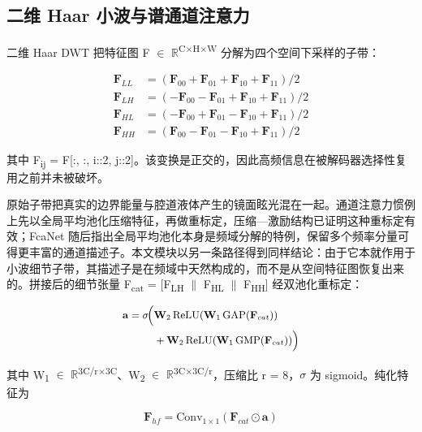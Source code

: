 \documentclass[conference]{IEEEtran}
\begin{document}
\subsection{二维 Haar 小波与谱通道注意力}

二维 Haar DWT 把特征图 F $\in$ $\mathbb{R}$\textsuperscript{C$\times$H$\times$W} 分解为四个空间下采样的子带：

\begin{align}
\mathbf{F}_{LL} &= (\mathbf{F}_{00}+\mathbf{F}_{01}+\mathbf{F}_{10}+\mathbf{F}_{11})/2\\\mathbf{F}_{LH} &= (-\mathbf{F}_{00}-\mathbf{F}_{01}+\mathbf{F}_{10}+\mathbf{F}_{11})/2\\\mathbf{F}_{HL} &= (-\mathbf{F}_{00}+\mathbf{F}_{01}-\mathbf{F}_{10}+\mathbf{F}_{11})/2\\\mathbf{F}_{HH} &= (\mathbf{F}_{00}-\mathbf{F}_{01}-\mathbf{F}_{10}+\mathbf{F}_{11})/2
\end{align}

其中 F\textsubscript{ij} = F[:, :, i::2, j::2]。该变换是正交的，因此高频信息在被解码器选择性复用之前并未被破坏。

原始子带把真实的边界能量与腔道液体产生的镜面眩光混在一起。通道注意力惯例上先以全局平均池化压缩特征，再做重标定，压缩—激励结构已证明这种重标定有效\cite{hu2018senet}；FcaNet 随后指出全局平均池化本身是频域分解的特例，保留多个频率分量可得更丰富的通道描述子\cite{qin2021fcanet}。本文模块以另一条路径得到同样结论：由于它本就作用于小波细节子带，其描述子是在频域中天然构成的，而不是从空间特征图恢复出来的。拼接后的细节张量 F\textsubscript{cat} = [F\textsubscript{LH} $\|$ F\textsubscript{HL} $\|$ F\textsubscript{HH}] 经双池化重标定：

\begin{equation}
\small
\begin{aligned}\mathbf{a}=\sigma\!\Big(&\mathbf{W}_2\,\mathrm{ReLU}(\mathbf{W}_1\,\mathrm{GAP}(\mathbf{F}_{cat}))\\&+\mathbf{W}_2\,\mathrm{ReLU}(\mathbf{W}_1\,\mathrm{GMP}(\mathbf{F}_{cat}))\Big)\end{aligned}
\end{equation}

其中 W\textsubscript{1} $\in$ $\mathbb{R}$\textsuperscript{3C/r$\times$3C}、W\textsubscript{2} $\in$ $\mathbb{R}$\textsuperscript{3C$\times$3C/r}，压缩比 r = 8，$\sigma$ 为 sigmoid。纯化特征为

\begin{equation}
\mathbf{F}_{hf}=\mathrm{Conv}_{1\times1}(\mathbf{F}_{cat}\odot\mathbf{a})
\end{equation}
\end{document}
